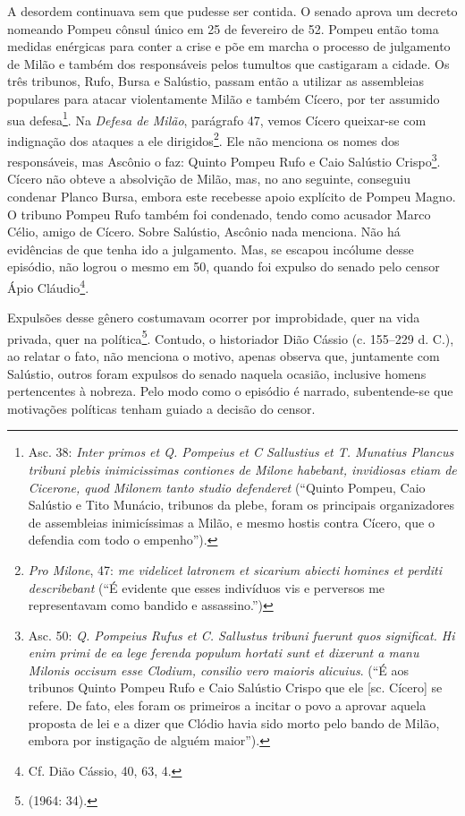 A desordem continuava sem que pudesse ser contida. O senado aprova um decreto
nomeando Pompeu cônsul único em 25 de fevereiro de 52.  Pompeu então toma
medidas enérgicas para conter a crise e põe em marcha o processo de julgamento
de Milão e também dos responsáveis pelos tumultos que castigaram a cidade. Os
três tribunos, Rufo, Bursa e Salústio, passam então a utilizar as assembleias
populares para atacar violentamente Milão e também Cícero, por ter assumido sua
defesa\footnote{Asc. 38: \emph{Inter primos et Q. Pompeius et C Sallustius et
T. Munatius Plancus tribuni plebis inimicissimas contiones de Milone habebant,
invidiosas etiam de Cicerone, quod Milonem tanto studio defenderet} (``Quinto
Pompeu, Caio Salústio e Tito Munácio, tribunos da plebe, foram os principais
organizadores de assembleias inimicíssimas a  Milão, e mesmo hostis contra
Cícero, que o defendia com todo o empenho'').}. Na \emph{Defesa de Milão},
parágrafo 47, vemos Cícero queixar-se com indignação dos ataques a ele
dirigidos\footnote{\emph{Pro Milone}, 47: \emph{me videlicet latronem et
sicarium abiecti homines et perditi describebant} (``É evidente que esses
indivíduos vis e perversos me representavam como bandido e assassino.'')}. Ele
não menciona os nomes dos responsáveis, mas Ascônio o faz: Quinto Pompeu Rufo e
Caio Salústio Crispo\footnote{Asc. 50: \emph{Q. Pompeius Rufus et C. Sallustus
tribuni fuerunt quos significat. Hi enim primi de ea lege ferenda populum
hortati sunt et dixerunt a manu Milonis occisum esse Clodium, consilio vero
maioris alicuius}. (``É aos tribunos Quinto Pompeu Rufo e
Caio Salústio Crispo que ele [sc. Cícero] se refere. De fato, eles foram os primeiros a incitar  o povo a aprovar aquela proposta de lei e a dizer que Clódio havia sido morto pelo
bando de Milão, embora por instigação de alguém maior”).}.  Cícero não obteve a
absolvição de Milão, mas, no ano seguinte, conseguiu condenar Planco Bursa,
embora este recebesse apoio explícito de Pompeu Magno. O tribuno Pompeu Rufo
também foi condenado, tendo como acusador Marco Célio, amigo de Cícero. Sobre
Salústio, Ascônio nada menciona. Não há evidências de que tenha ido a
julgamento. Mas, se escapou incólume desse episódio, não logrou o mesmo em 50,
quando foi expulso do senado pelo censor Ápio Cláudio\footnote{ Cf. Dião
Cássio, 40, 63, 4.}. 

Expulsões desse gênero costumavam ocorrer por improbidade, quer na vida
privada, quer na política\footnote{ (1964: 34).}. Contudo, o historiador
Dião Cássio (c. 155--229 d. C.), ao relatar o fato, não menciona o motivo,
apenas observa que, juntamente com Salústio, outros foram expulsos do senado
naquela ocasião, inclusive homens pertencentes à nobreza. Pelo modo como o
episódio é narrado, subentende-se que motivações políticas tenham guiado a
decisão do censor.

